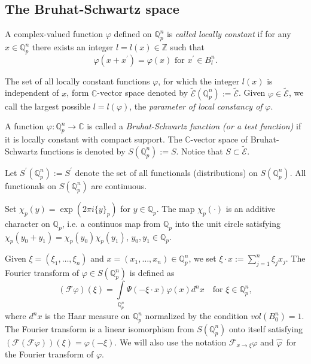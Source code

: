 \documentclass{amsart}\usepackage{amsfonts}
\theoremstyle{plain}
\numberwithin{equation}{section}
\begin{document}
\subsection{The Bruhat-Schwartz space}

A complex-valued function $\varphi$ defined on $\mathbb{Q}_{p}^{n}$ is
\textit{called locally constant} if for any $x\in\mathbb{Q}_{p}^{n}$ there
exists an integer $l=l(x)\in\mathbb{Z}$ such that\begin{equation}
\varphi(x+x^{\prime})=\varphi(x)\text{ for }x^{\prime}\in B_{l}^{n}.
\label{local_constancy}\end{equation}


The set of all locally constant functions $\varphi$, for which the integer
$l(x)$ is independent of $x$, form $\mathbb{C}$-vector space denoted by
$\widetilde{\mathcal{E}}(\mathbb{Q}_{p}^{n}):=\widetilde{\mathcal{E}}$. Given
$\varphi\in\widetilde{\mathcal{E}}$, we call the largest possible $l=l\left(
\varphi\right)  $, the \textit{parameter of local constancy of} $\varphi$.

A function $\varphi:\mathbb{Q}_{p}^{n}\rightarrow\mathbb{C}$ is called a
\textit{Bruhat-Schwartz function (or a test function)} if it is locally
constant with compact support. The $\mathbb{C}$-vector space of
Bruhat-Schwartz functions is denoted by $S(\mathbb{Q}_{p}^{n}):=S$. Notice
that $S\subset\widetilde{\mathcal{E}}$.

Let $S^{\prime}(\mathbb{Q}_{p}^{n}):=S^{\prime}$ denote the set of all
functionals (distributions) on $S(\mathbb{Q}_{p}^{n})$. All functionals on
$S(\mathbb{Q}_{p}^{n})$ are continuous.

Set $\chi_{p}(y)=\exp(2\pi i\{y\}_{p})$ for $y\in\mathbb{Q}_{p}$. The map
$\chi_{p}(\cdot)$ is an additive character on $\mathbb{Q}_{p}$, i.e. a
continuos map from $\mathbb{Q}_{p}$ into the unit circle satisfying $\chi
_{p}(y_{0}+y_{1})=\chi_{p}(y_{0})\chi_{p}(y_{1})$, $y_{0},y_{1}\in
\mathbb{Q}_{p}$.

Given $\xi=(\xi_{1},\dots,\xi_{n})$ and $x=(x_{1},\dots,x_{n})\in
\mathbb{Q}_{p}^{n}$, we set $\xi\cdot x:=\sum_{j=1}^{n}\xi_{j}x_{j}$. The
Fourier transform of $\varphi\in S(\mathbb{Q}_{p}^{n})$ is defined as
\[
(\mathcal{F}\varphi)(\xi)={\displaystyle\int\limits_{\mathbb{Q}_{p}^{n}}}
\Psi(-\xi\cdot x)\varphi(x)d^{n}x\quad\text{for }\xi\in\mathbb{Q}_{p}^{n},
\]
where $d^{n}x$ is the Haar measure on $\mathbb{Q}_{p}^{n}$ normalized by the
condition $vol(B_{0}^{n})=1$. The Fourier transform is a linear isomorphism
from $S(\mathbb{Q}_{p}^{n})$ onto itself satisfying $(\mathcal{F}(\mathcal{F}\varphi))(\xi)=\varphi(-\xi)$. We will also use the notation
$\mathcal{F}_{x\rightarrow\xi}\varphi$ and $\widehat{\varphi}$\ for the
Fourier transform of $\varphi$.
\end{document}
